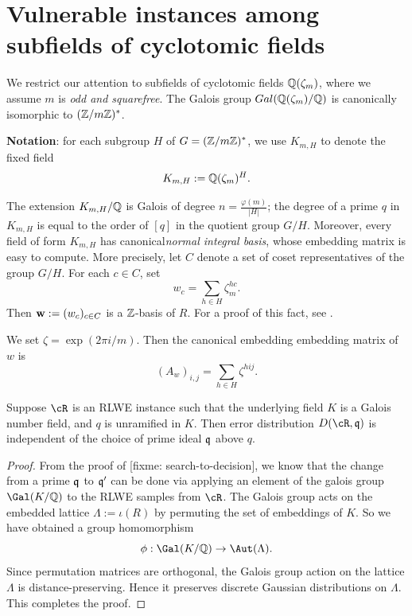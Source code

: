 \documentclass{amsart}
\begin{document}
\section{Vulnerable instances among subfields of cyclotomic fields}\label{sec: sub-cyclotomics}

We restrict our attention to subfields of cyclotomic fields $\mathbb{Q}(\zeta_m)$, where we assume $m$ is {\it odd and squarefree}. The Galois group $Gal(\mathbb{Q}(\zeta_m)/\mathbb{Q})$ is canonically isomorphic to $(\mathbb{Z}/m\mathbb{Z})^*$.

{\bf Notation}: for each subgroup $H$ of $G = (\mathbb{Z}/m\mathbb{Z})^*$, we use $K_{m,H}$ to denote the fixed field
\[
    K_{m,H} := \mathbb{Q}(\zeta_m)^H.
\]

The extension $K_{m,H}/\mathbb{Q}$ is Galois of degree $n = \frac{\varphi(m)}{|H|}$; the degree of a prime $q$ in $K_{m,H}$ is equal to the order of $[q]$ in the quotient group $G/H$. Moreover, every field of form $K_{m,H}$ has canonical{\it normal integral basis}, whose embedding matrix is easy to compute. More precisely, let $C$ denote a set of coset representatives of the group $G/H$. For each $c \in C$, set
\[
    w_c =  \sum_{h \in H} \zeta_m^{hc}.
\]
Then  ${\bf w} := (w_c)_{c \in C}$ is a $\mathbb{Z}$-basis of $R$. For a proof of this fact, see \cite[Proposition 6.1]{johnston2011notes}.

We set $\zeta = \exp(2\pi i /m)$. Then the canonical embedding embedding matrix of $w$ is
\[
    (A_w)_{i,j} = \sum_{h \in H}{\zeta^{hij}}.
\]

\begin{Lemma} \label{lem: symmetry}
Suppose $\cR$ is an RLWE instance such that the underlying field $K$ is a Galois number field, and $q$ is unramified in $K$. Then error distribution $D(\cR, \fq)$ is independent of the choice of prime ideal $\mathfrak{q}$ above $q$.
\end{Lemma}

\begin{proof}
From the proof of [fixme: search-to-decision], we know that the change from a prime $\mathfrak{q}$ to $\mathfrak{q}'$ can be done via applying an element of the galois group $\Gal(K/\bQ)$ to the RLWE samples from $\cR$. The Galois group acts on the embedded lattice $\Lambda := \iota(R)$ by permuting the set of embeddings of $K$. So we have obtained a group homomorphism $$\phi: \Gal(K/\bQ) \to \Aut(\Lambda).$$
Since permutation matrices are orthogonal, the Galois group action on the lattice $\Lambda$ is distance-preserving. Hence it preserves discrete Gaussian distributions on $\Lambda$. This completes the proof.
\end{proof}
\end{document}
